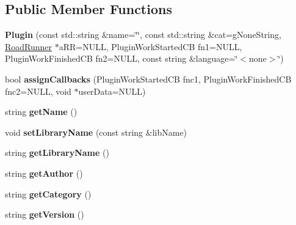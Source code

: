 \subsection*{Public Member Functions}
\begin{DoxyCompactItemize}
\item 
\hypertarget{classrr_1_1_plugin_a10ee29ebbfa8c52eaf70e3ec2aa90600}{{\bfseries Plugin} (const std\-::string \&name=\char`\"{}\char`\"{}, const std\-::string \&cat=g\-None\-String, \hyperlink{classrr_1_1_road_runner}{Road\-Runner} $\ast$a\-R\-R=N\-U\-L\-L, Plugin\-Work\-Started\-C\-B fn1=N\-U\-L\-L, Plugin\-Work\-Finished\-C\-B fn2=N\-U\-L\-L, const string \&language=\char`\"{}$<$none$>$\char`\"{})}\label{classrr_1_1_plugin_a10ee29ebbfa8c52eaf70e3ec2aa90600}

\item 
\hypertarget{classrr_1_1_plugin_a7f6190a84c72ed1987a78148abc9a809}{bool {\bfseries assign\-Callbacks} (Plugin\-Work\-Started\-C\-B fnc1, Plugin\-Work\-Finished\-C\-B fnc2=N\-U\-L\-L, void $\ast$user\-Data=N\-U\-L\-L)}\label{classrr_1_1_plugin_a7f6190a84c72ed1987a78148abc9a809}

\item 
\hypertarget{classrr_1_1_plugin_a90f340281a77ce2fc5d9dbcae9cce26b}{string {\bfseries get\-Name} ()}\label{classrr_1_1_plugin_a90f340281a77ce2fc5d9dbcae9cce26b}

\item 
\hypertarget{classrr_1_1_plugin_ac7c8a3ccd70e889bc950c19255e244ec}{void {\bfseries set\-Library\-Name} (const string \&lib\-Name)}\label{classrr_1_1_plugin_ac7c8a3ccd70e889bc950c19255e244ec}

\item 
\hypertarget{classrr_1_1_plugin_a4fe69ca2a2c0c1a3c39e592a5a6539fa}{string {\bfseries get\-Library\-Name} ()}\label{classrr_1_1_plugin_a4fe69ca2a2c0c1a3c39e592a5a6539fa}

\item 
\hypertarget{classrr_1_1_plugin_a369cb2cc7982dd22320a22048b9b083c}{string {\bfseries get\-Author} ()}\label{classrr_1_1_plugin_a369cb2cc7982dd22320a22048b9b083c}

\item 
\hypertarget{classrr_1_1_plugin_a8e023f2ac9e0fa33e32411462ad452a6}{string {\bfseries get\-Category} ()}\label{classrr_1_1_plugin_a8e023f2ac9e0fa33e32411462ad452a6}

\item 
\hypertarget{classrr_1_1_plugin_a0c092746cde562c97c3014c707326644}{string {\bfseries get\-Version} ()}\label{classrr_1_1_plugin_a0c092746cde562c97c3014c707326644}


\end{DoxyCompactItemize}

